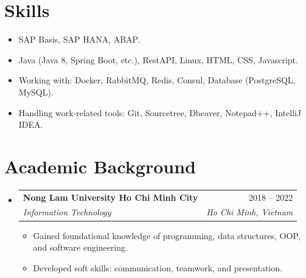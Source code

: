 \documentclass[letterpaper,11pt]{article}
\makeatletter
\newcommand{\resumeItem}[1]{
  \item\small{
    {#1 \vspace{-2pt}}
  }
}
\newcommand{\resumeSubheading}[4]{
  \vspace{-2pt}\item
    \begin{tabular*}{0.97\textwidth}[t]{l@{\extracolsep{\fill}}r}
      \textbf{#1} & #2 \\
      \textit{\small#3} & \textit{\small #4} \\
    \end{tabular*}\vspace{-7pt}
}
\newcommand{\resumeSubHeadingListStart}{\begin{itemize}[leftmargin=0.15in, label={}]}
\newcommand{\resumeSubHeadingListEnd}{\end{itemize}}
\newcommand{\resumeItemListStart}{\begin{itemize}}
\newcommand{\resumeItemListEnd}{\end{itemize}\vspace{-5pt}}
\makeatother
\begin{document}
\section{Skills}
 \begin{itemize}[leftmargin=0.15in, label={}]
    \small{\item{
     \begin{itemize}[leftmargin=0.15in, label={$\bullet$}]
        \resumeItem{SAP Basis, SAP HANA, ABAP.}
        \resumeItem{Java (Java 8, Spring Boot, etc.), RestAPI, Linux, HTML, CSS, Javascript.}
        \resumeItem{Working with: Docker, RabbitMQ, Redis, Consul, Database (PostgreSQL, MySQL).}
        \resumeItem{Handling work-related tools: Git, Sourcetree, Dbeaver, Notepad++, IntelliJ IDEA.}
     \end{itemize}
    }}
 \end{itemize}

\section{Academic Background}
  \resumeSubHeadingListStart
    \resumeSubheading
      {Nong Lam University Ho Chi Minh City}{2018 -- 2022}
      {Information Technology}{Ho Chi Minh, Vietnam}
      \resumeItemListStart
        \resumeItem{Gained foundational knowledge of programming, data structures, OOP, and software engineering.}
        \resumeItem{Developed soft skills: communication, teamwork, and presentation.}
      \resumeItemListEnd
  \resumeSubHeadingListEnd
\end{document}
